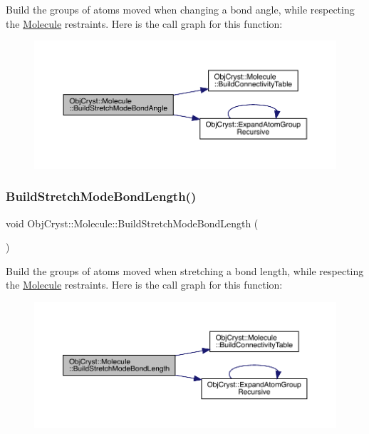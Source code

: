 Build the groups of atoms moved when changing a bond angle, while respecting the \mbox{\hyperlink{class_obj_cryst_1_1_molecule}{Molecule}} restraints. Here is the call graph for this function\+:
\nopagebreak
\begin{figure}[H]
\begin{center}
\leavevmode
\includegraphics[width=350pt]{class_obj_cryst_1_1_molecule_a3d507a4e25612a7412cbcc84b5a831ae_cgraph}
\end{center}
\end{figure}
\mbox{\label{class_obj_cryst_1_1_molecule_abb51819a0eae8b612fb4007ffa16d2b7}} 
\subsubsection{\texorpdfstring{BuildStretchModeBondLength()}{BuildStretchModeBondLength()}}
{\footnotesize\ttfamily void Obj\+Cryst\+::\+Molecule\+::\+Build\+Stretch\+Mode\+Bond\+Length (\begin{DoxyParamCaption}{ }\end{DoxyParamCaption})}

Build the groups of atoms moved when stretching a bond length, while respecting the \mbox{\hyperlink{class_obj_cryst_1_1_molecule}{Molecule}} restraints. Here is the call graph for this function\+:
\nopagebreak
\begin{figure}[H]
\begin{center}
\leavevmode
\includegraphics[width=350pt]{class_obj_cryst_1_1_molecule_abb51819a0eae8b612fb4007ffa16d2b7_cgraph}
\end{center}
\end{figure}
\mbox{\label{class_obj_cryst_1_1_molecule_a83b7b9bac2ce9fe7b310b5267232b1ca}} 
